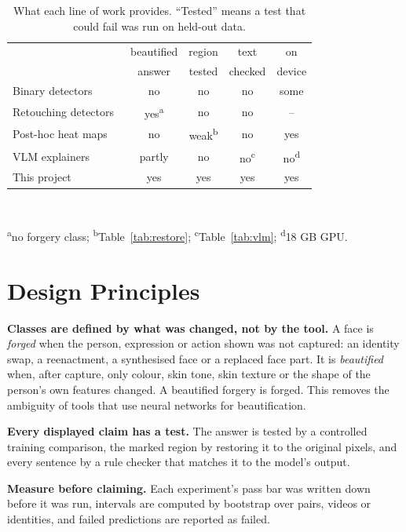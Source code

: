 \documentclass[conference,a4paper]{IEEEtran}
\begin{document}
\begin{table}[!htb]
\centering
\caption{What each line of work provides. ``Tested'' means a test that could fail was run on held-out data.}
\label{tab:compare}
\footnotesize
\setlength{\tabcolsep}{3pt}
\begin{tabular}{@{}lcccc@{}}
\toprule
 & beautified & region & text & on \\
 & answer & tested & checked & device \\
\midrule
Binary detectors~\cite{effort,forensicsadapter,sbi} & no & no & no & some \\
Retouching detectors~\cite{retouchingffhq} & yes\textsuperscript{a} & no & no & -- \\
Post-hoc heat maps~\cite{gradcam,scorecam} & no & weak\textsuperscript{b} & no & yes \\
VLM explainers~\cite{fakevlm2025} & partly & no & no\textsuperscript{c} & no\textsuperscript{d} \\
This project & yes & yes & yes & yes \\
\bottomrule
\end{tabular}\\[2pt]
\parbox{\columnwidth}{\scriptsize \textsuperscript{a}no forgery class; \textsuperscript{b}Table~\ref{tab:restore};
\textsuperscript{c}Table~\ref{tab:vlm}; \textsuperscript{d}18 GB GPU.}
\end{table}

\section{Design Principles}

\textbf{Classes are defined by what was changed, not by the tool.} A face is \emph{forged} when the person, expression or
action shown was not captured: an identity swap, a reenactment, a synthesised face or a replaced face part. It is
\emph{beautified} when, after capture, only colour, skin tone, skin texture or the shape of the person's own features changed.
A beautified forgery is forged. This removes the ambiguity of tools that use neural networks for beautification.

\textbf{Every displayed claim has a test.} The answer is tested by a controlled training comparison, the marked region by
restoring it to the original pixels, and every sentence by a rule checker that matches it to the model's output.

\textbf{Measure before claiming.} Each experiment's pass bar was written down before it was run, intervals are computed by
bootstrap over pairs, videos or identities, and failed predictions are reported as failed.
\end{document}
